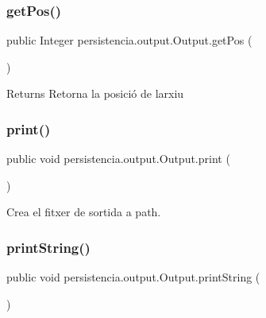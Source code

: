 \subsubsection{\texorpdfstring{get\+Pos()}{getPos()}}
{\footnotesize\ttfamily public Integer persistencia.\+output.\+Output.\+get\+Pos (\begin{DoxyParamCaption}{ }\end{DoxyParamCaption})\hspace{0.3cm}{\ttfamily [inline]}}

\begin{DoxyReturn}{Returns}
Retorna la posició de l\textquotesingle{}arxiu 
\end{DoxyReturn}
\mbox{\label{classpersistencia_1_1output_1_1Output_a416850e57f55bd371d60b2aae8e7e983}} 
\subsubsection{\texorpdfstring{print()}{print()}}
{\footnotesize\ttfamily public void persistencia.\+output.\+Output.\+print (\begin{DoxyParamCaption}{ }\end{DoxyParamCaption})\hspace{0.3cm}{\ttfamily [inline]}}



Crea el fitxer de sortida a path. 

\mbox{\label{classpersistencia_1_1output_1_1Output_ae6398e0602d281fd044d6557a16eb727}} 
\subsubsection{\texorpdfstring{print\+String()}{printString()}}
{\footnotesize\ttfamily public void persistencia.\+output.\+Output.\+print\+String (\begin{DoxyParamCaption}{ }\end{DoxyParamCaption})\hspace{0.3cm}{\ttfamily [inline]}}



